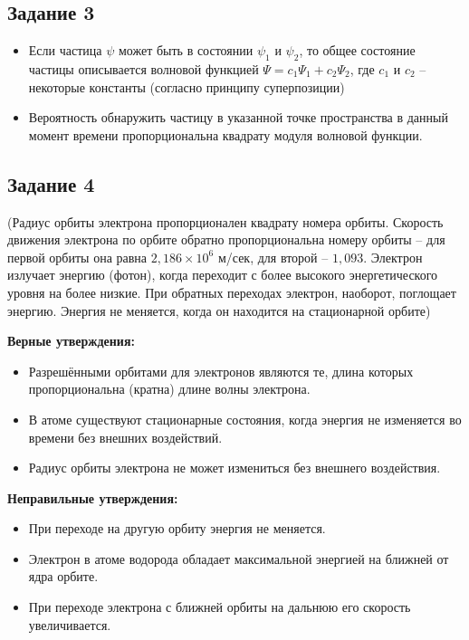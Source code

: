 \documentclass[../main.tex]{subfiles}
\begin{document}
\subsection{Задание 3}
\begin{itemize}
    \item Если частица $\psi$ может быть в состоянии $\psi_1$ и $\psi_2$, то общее состояние частицы описывается волновой функцией $\Psi = c_1 \Psi_1 + c_2 \Psi_2$, где $c_1$ и $c_2$ -- некоторые константы (согласно принципу суперпозиции)
    \item Вероятность обнаружить частицу в указанной точке пространства в данный момент времени пропорциональна квадрату модуля волновой функции.
\end{itemize}

\subsection{Задание 4}
(Радиус орбиты электрона пропорционален квадрату номера орбиты. Скорость движения электрона по орбите обратно пропорциональна номеру орбиты -- для первой орбиты она равна $2,186 \times 10^6$ м/сек, для второй -- $1,093$.
Электрон излучает энергию (фотон), когда переходит с более высокого энергетического уровня на более низкие. При обратных переходах электрон, наоборот, поглощает энергию. Энергия не меняется, когда он находится на стационарной орбите)

\textbf{Верные утверждения:}
\begin{itemize}
    \item Разрешёнными орбитами для электронов являются те, длина которых пропорциональна (кратна) длине волны электрона.
    \item В атоме существуют стационарные состояния, когда энергия не изменяется во времени без внешних воздействий.
    \item Радиус орбиты электрона не может измениться без внешнего воздействия.
\end{itemize}

\textbf{Неправильные утверждения:}
\begin{itemize}
    \item При переходе на другую орбиту энергия не меняется.
    \item Электрон в атоме водорода обладает максимальной энергией на ближней от ядра орбите.
    \item При переходе электрона с ближней орбиты на дальнюю его скорость увеличивается.
\end{itemize}
\end{document}
